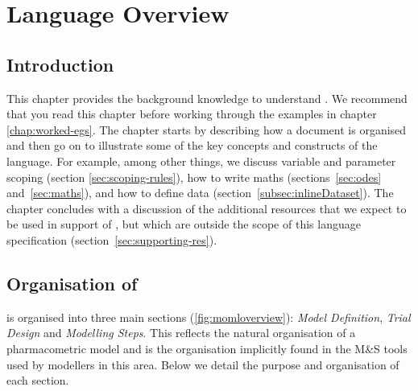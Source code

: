 \chapter{Language Overview}
\label{chap:lang-overview}

\section{Introduction}

This chapter provides the background knowledge 
to understand \pharmml. We recommend that you read this chapter
before working through the examples in chapter
\ref{chap:worked-egs}. The chapter starts by describing how a
\pharmml document is organised and then go on to illustrate some of
the key concepts and constructs of the language. For example, among
other things, we discuss variable and parameter scoping (section
\ref{sec:scoping-rules}), how to write maths (sections~\ref{sec:odes}
and~\ref{sec:maths}), and how to define data (section~\ref{subsec:inlineDataset}).
The chapter concludes with a discussion of the additional resources that
we expect to be used in support of \pharmml, but which are outside the
scope of this language specification (section~\ref{sec:supporting-res}).

\section{Organisation of \pharmml}
\label{sec:structure-overview}

\pharmml is organised into three main sections (\ref{fig:momloverview}): \emph{Model Definition}, \emph{Trial
  Design} and \emph{Modelling Steps}. This reflects the natural
organisation of a pharmacometric model and is the organisation
implicitly found in the M\&S tools used by modellers in this
area. Below we detail the purpose and
organisation of each section.

